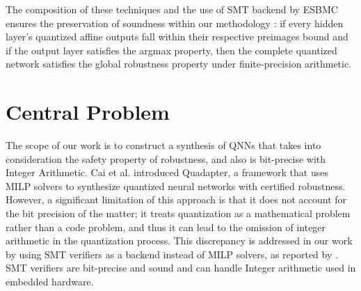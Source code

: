 
The composition of these techniques and the use of SMT backend by ESBMC ensures the preservation of soundness within our methodology \cite{sena2021verifying}: if every hidden layer's quantized affine outputs fall within their respective preimages bound and if the output layer satisfies the argmax property, then the complete quantized network satisfies the global robustness property under finite-precision arithmetic.
\section{Central Problem}



The scope of our work is to construct a synthesis of QNNs that takes into consideration the safety property of robustness, and also is bit-precise with Integer Arithmetic. Cai et al. \cite{cai2025certified} introduced Quadapter, a framework that uses MILP solvers to synthesize quantized neural networks with certified robustness. However, a significant limitation of this approach is that it does not account for the bit precision of the matter; it treats quantization as a mathematical problem rather than a code problem, and thus it can lead to the omission of integer arithmetic in the quantization process. This discrepancy is addressed in our work by using SMT verifiers as a backend instead of MILP solvers, as reported by \cite{baranowski2020smt}. SMT verifiers are bit-precise and sound and can handle Integer arithmetic used in embedded hardware.


